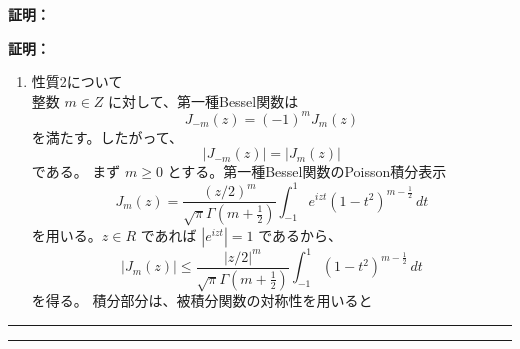 \documentclass[a4paper,10.5pt]{article}
\numberwithin{equation}{section}
\newenvironment{proofbox}
{\begin{prooflabel}\textbf{証明：}\end{prooflabel}\vspace{0.8em}}
{\par\vspace{1em}\hrule\vspace{1em}}
\begin{document}
\begin{proofbox}
\begin{proofbox}
\begin{enumerate}
\begin{equation}
\end{equation}
を得る。左辺は
\begin{equation}
\exp\left[\frac{-z}{2}\left(t-\frac{1}{t}\right)\right]=\sum_{m=-\infty}^{\infty}J_m(-z)t^m
\end{equation}
と書ける。一方、右辺で添字を $m\to -m$ と取り直すと、
\begin{equation}
\sum_{m=-\infty}^{\infty}J_m(z)t^{-m}=\sum_{m=-\infty}^{\infty}J_{-m}(z)t^m
\end{equation}
となる。したがって、$t^m$ の係数を比較することにより
\begin{equation}
J_{-m}(z)=J_m(-z)
\end{equation}
を得る。
次に、生成関数において $t\to -t$ とすると、
\begin{equation}
\exp\left[\frac{z}{2}\left(-t+\frac{1}{t}\right)\right]=\sum_{m=-\infty}^{\infty}(-1)^mJ_m(z)t^m
\end{equation}
となる。左辺は
\begin{equation}
\exp\left[\frac{-z}{2}\left(t-\frac{1}{t}\right)\right]=\sum_{m=-\infty}^{\infty}J_m(-z)t^m
\end{equation}
であるから、係数比較により
\begin{equation}
J_m(-z)=(-1)^mJ_m(z)
\end{equation}
を得る。したがって、
\begin{equation}
\boxed{J_{-m}(z)=(-1)^mJ_m(z)}
\end{equation}
が成り立つ。
\item 性質2について\\
        整数 $m\in Z$ に対して、第一種Bessel関数は
\begin{equation}
J_{-m}(z)=(-1)^mJ_m(z)
\end{equation}
を満たす。したがって、
\begin{equation}
|J_{-m}(z)|=|J_m(z)|
\end{equation}
である。
まず $m\geq 0$ とする。第一種Bessel関数のPoisson積分表示
\begin{equation}
J_m(z)=\frac{(z/2)^m}{\sqrt{\pi}\Gamma\left(m+\frac{1}{2}\right)}\int_{-1}^{1}e^{izt}(1-t^2)^{m-\frac{1}{2}}\,dt
\end{equation}
を用いる。$z\in R$ であれば $|e^{izt}|=1$ であるから、
\begin{equation}
|J_m(z)|\leq\frac{|z/2|^m}{\sqrt{\pi}\Gamma\left(m+\frac{1}{2}\right)}\int_{-1}^{1}(1-t^2)^{m-\frac{1}{2}}\,dt
\end{equation}
を得る。
積分部分は、被積分関数の対称性を用いると
\begin{equation}

\end{equation}
\end{enumerate}
\end{proofbox}
\end{proofbox}
\end{document}
